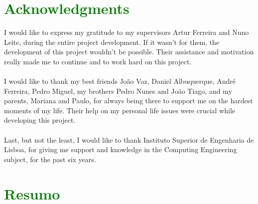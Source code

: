 \chapter*{\textcolor{green}{Acknowledgments}}

I would like to express my gratitude to my supervisors Artur Ferreira and Nuno Leite, during the entire project development. If it wasn't for them, the development of this project wouldn't be possible. Their assistance and motivation really made me to continue and to work hard on this project.\\
\\
I would like to thank my best friends João Vaz, Daniel Albuquerque, André Ferreira, Pedro Miguel, my brothers Pedro Nunes and João Tiago, and my parents, Mariana and Paulo, for always being there to support me on the hardest moments of my life. Their help on my personal life issues were crucial while developing this project.\\
\\
Last, but not the least, I would like to thank Instituto Superior de Engenharia de Lisboa, for giving me support and knowledge in the Computing Engineering subject, for the past six years.
\
\chapter*{\textcolor{green}{Resumo}}

